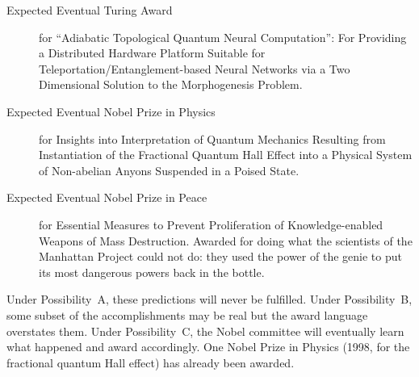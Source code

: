 \begin{description}
\item[Expected Eventual Turing Award] for ``Adiabatic Topological Quantum Neural Computation'': For Providing a Distributed Hardware Platform Suitable for Teleportation/Entanglement-based Neural Networks via a Two Dimensional Solution to the Morphogenesis Problem.
\item[Expected Eventual Nobel Prize in Physics] for Insights into Interpretation of Quantum Mechanics Resulting from Instantiation of the Fractional Quantum Hall Effect into a Physical System of Non-abelian Anyons Suspended in a Poised State.
\item[Expected Eventual Nobel Prize in Peace] for Essential Measures to Prevent Proliferation of Knowledge-enabled Weapons of Mass Destruction. Awarded for doing what the scientists of the Manhattan Project could not do: they used the power of the genie to put its most dangerous powers back in the bottle.
\end{description}

Under Possibility~A, these predictions will never be fulfilled. Under Possibility~B, some subset of the accomplishments may be real but the award language overstates them. Under Possibility~C, the Nobel committee will eventually learn what happened and award accordingly. One Nobel Prize in Physics (1998, for the fractional quantum Hall effect) has already been awarded.

\chapterreturn
